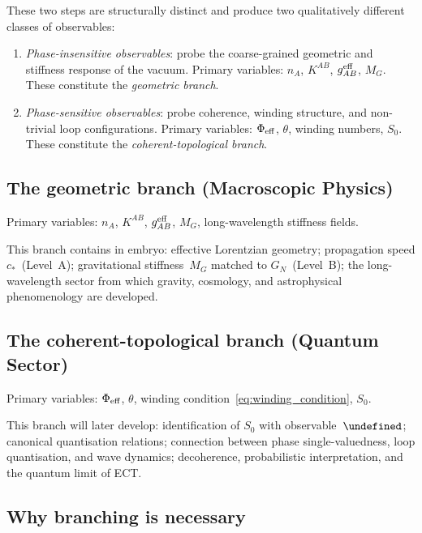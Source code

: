\documentclass[11pt,a4paper]{article}
\let\hbar\undefined
\numberwithin{equation}{section}
\begin{document}
These two steps are structurally distinct and produce two qualitatively
different classes of observables:
\begin{enumerate}
  \item \textit{Phase-insensitive observables}: probe the coarse-grained
    geometric and stiffness response of the vacuum.
    Primary variables: $n_A$, $K^{AB}$, $g^{\rm eff}_{AB}$, $M_G$.
    These constitute the \emph{geometric branch}.
  \item \textit{Phase-sensitive observables}: probe coherence,
    winding structure, and non-trivial loop configurations.
    Primary variables: $\Phi_{\rm eff}$, $\theta$, winding numbers, $S_0$.
    These constitute the \emph{coherent-topological branch}.
\end{enumerate}

\subsection{The geometric branch (Macroscopic Physics)}
\label{sec:geom_branch}

Primary variables: $n_A$, $K^{AB}$, $g^{\rm eff}_{AB}$, $M_G$,
long-wavelength stiffness fields.

This branch contains in embryo:
effective Lorentzian geometry; propagation speed $c_*$~(Level~A);
gravitational stiffness~$M_G$ matched to $G_N$~(Level~B);
the long-wavelength sector from which gravity, cosmology, and
astrophysical phenomenology are developed.

\subsection{The coherent-topological branch (Quantum Sector)}
\label{sec:coh_branch}

Primary variables: $\Phi_{\rm eff}$, $\theta$,
winding condition~\eqref{eq:winding_condition}, $S_0$.

This branch will later develop:
identification of $S_0$ with observable~$\hbar$;
canonical quantisation relations;
connection between phase single-valuedness, loop quantisation,
and wave dynamics;
decoherence, probabilistic interpretation, and the quantum limit of ECT.

\subsection{Why branching is necessary}
\label{sec:why_branching}
\end{document}
